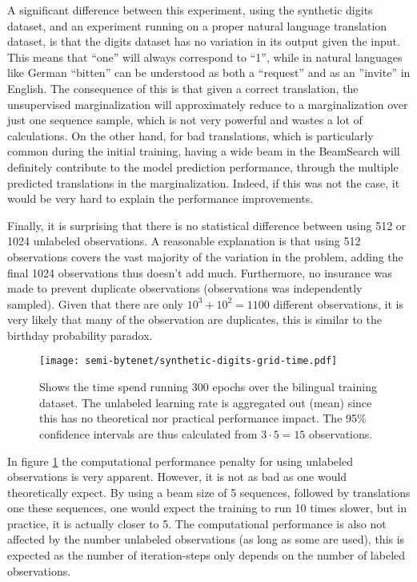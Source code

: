 A significant difference between this experiment, using the synthetic digits dataset, and an experiment running on a proper natural language translation dataset, is that the digits dataset has no variation in its output given the input. This means that ``one'' will always correspond to ``1'', while in natural languages like German ``bitten'' can be understood as both a ``request'' and as an ''invite'' in English. The consequence of this is that given a correct translation, the unsupervised marginalization will approximately reduce to a marginalization over just one sequence sample, which is not very powerful and wastes a lot of calculations. On the other hand, for bad translations, which is particularly common during the initial training, having a wide beam in the BeamSearch will definitely contribute to the model prediction performance, through the multiple predicted translations in the marginalization. Indeed, if this was not the case, it would be very hard to explain the performance improvements.

Finally, it is surprising that there is no statistical difference between using 512 or 1024 unlabeled observations. A reasonable explanation is that using 512 observations covers the vast majority of the variation in the problem, adding the final 1024 observations thus doesn't add much. Furthermore, no insurance was made to prevent duplicate observations (observations was independently sampled). Given that there are only $10^3 + 10^2 = 1100$ different observations, it is very likely that many of the observation are duplicates, this is similar to the birthday probability paradox.

\begin{figure}[h]
    \centering
    \texttt{[image: semi-bytenet/synthetic-digits-grid-time.pdf]}
    \caption{Shows the time spend running 300 epochs over the bilingual training dataset. The unlabeled learning rate is aggregated out (mean) since this has no theoretical nor practical performance impact. The 95\% confidence intervals are thus calculated from $3 \cdot 5 = 15$ observations.}
    \label{fig:result:semi-bytenet:time}
\end{figure}

In figure \ref{fig:result:semi-bytenet:time} the computational performance penalty for using unlabeled observations is very apparent. However, it is not as bad as one would theoretically expect. By using a beam size of 5 sequences, followed by translations one these sequences, one would expect the training to run 10 times slower, but in practice, it is actually closer to 5. The computational performance is also not affected by the number unlabeled observations (as long as some are used), this is expected as the number of iteration-steps only depends on the number of labeled observations.

